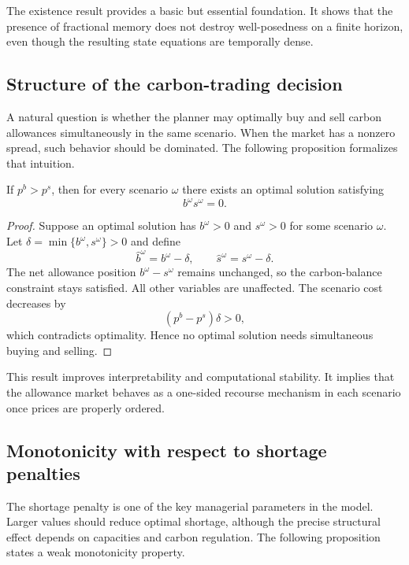 The existence result provides a basic but essential foundation. It shows that the presence of fractional memory does not destroy well-posedness on a finite horizon, even though the resulting state equations are temporally dense.

\subsection{Structure of the carbon-trading decision}
A natural question is whether the planner may optimally buy and sell carbon allowances simultaneously in the same scenario. When the market has a nonzero spread, such behavior should be dominated. The following proposition formalizes that intuition.

\begin{proposition}
If $p^b>p^s$, then for every scenario $\omega$ there exists an optimal solution satisfying
\begin{equation}
 b^{\omega}s^{\omega}=0.
\end{equation}
\end{proposition}

\begin{proof}
Suppose an optimal solution has $b^{\omega}>0$ and $s^{\omega}>0$ for some scenario $\omega$. Let $\delta=\min\{b^{\omega},s^{\omega}\}>0$ and define
\begin{equation}
\widehat b^{\omega}=b^{\omega}-\delta,
\qquad
\widehat s^{\omega}=s^{\omega}-\delta.
\end{equation}
The net allowance position $b^{\omega}-s^{\omega}$ remains unchanged, so the carbon-balance constraint stays satisfied. All other variables are unaffected. The scenario cost decreases by
\begin{equation}
(p^b-p^s)\delta>0,
\end{equation}
which contradicts optimality. Hence no optimal solution needs simultaneous buying and selling.
\end{proof}

This result improves interpretability and computational stability. It implies that the allowance market behaves as a one-sided recourse mechanism in each scenario once prices are properly ordered.

\subsection{Monotonicity with respect to shortage penalties}
The shortage penalty is one of the key managerial parameters in the model. Larger values should reduce optimal shortage, although the precise structural effect depends on capacities and carbon regulation. The following proposition states a weak monotonicity property.

